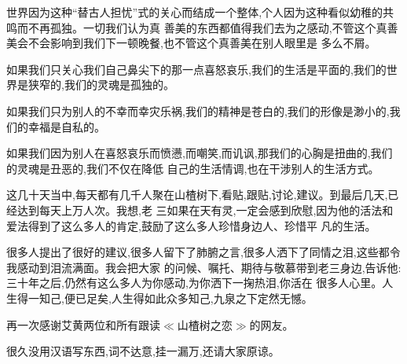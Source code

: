 ﻿\documentclass[12pt]{article}
\begin{document}
世界因为这种``替古人担忧''式的关心而结成一个整体,个人因为这种看似幼稚的共鸣而不再孤独。一切我们认为真
善美的东西都值得我们去为之感动,不管这个真善美会不会影响到我们下一顿晚餐,也不管这个真善美在别人眼里是
多么不屑。



如果我们只关心我们自己鼻尖下的那一点喜怒哀乐,我们的生活是平面的,我们的世界是狭窄的,我们的灵魂是孤独的。



如果我们只为别人的不幸而幸灾乐祸,我们的精神是苍白的,我们的形像是渺小的,我们的幸福是自私的。



如果我们因为别人在喜怒哀乐而愤懑,而嘲笑,而讥讽,那我们的心胸是扭曲的,我们的灵魂是丑恶的,我们不仅在降低
自己的生活情调,也在干涉别人的生活方式。



这几十天当中,每天都有几千人聚在山楂树下,看贴,跟贴,讨论,建议。到最后几天,已经达到每天上万人次。我想,老
三如果在天有灵,一定会感到欣慰,因为他的活法和爱法得到了这么多人的肯定,鼓励了这么多人珍惜身边人、珍惜平
凡的生活。



很多人提出了很好的建议,很多人留下了肺腑之言,很多人洒下了同情之泪,这些都令我感动到泪流满面。我会把大家
的问候、嘱托、期待与敬慕带到老三身边,告诉他:三十年之后,仍然有这么多人为你感动,为你洒下一掬热泪,你活在
很多人心里。人生得一知己,便已足矣,人生得如此众多知己,九泉之下定然无憾。



再一次感谢艾黄两位和所有跟读$\ll$山楂树之恋$\gg$的网友。



很久没用汉语写东西,词不达意,挂一漏万,还请大家原谅。
\end{document}
